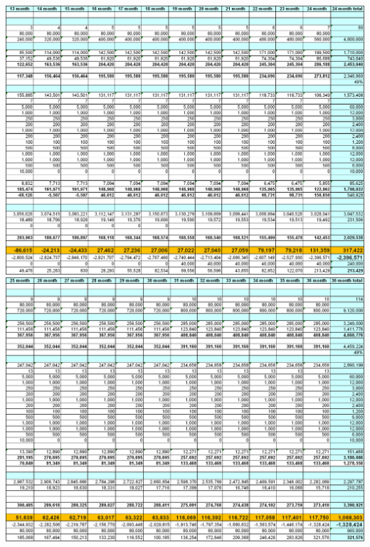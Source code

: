 
\includegraphics[width=\textwidth]{graphics/budget2ndyear}
\includegraphics[width=\textwidth]{graphics/budget3rdyear}